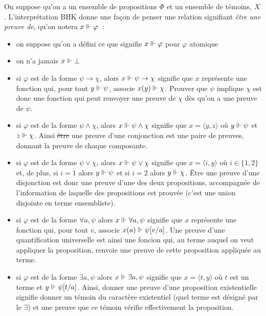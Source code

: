 \documentclass{article}
\begin{document}
On suppose qu'on a un ensemble de propositions $\Phi$ et un ensemble de témoins, $X$. L'interprétation BHK donne une façon de penser une relation signifiant \textit{être une preuve de}, qu'on notera $x\Vdash \varphi$~:
\begin{itemize}
\item on suppose qu'on a défini ce que signifie $x\Vdash\varphi$ pour $\varphi$ atomique
\item on n'a jamais $x\Vdash \bot$
\item si $\varphi$ est de la forme $\psi\to \chi$, alors $x\Vdash\psi \to\chi$ signifie que $x$ représente une fonction qui, pour tout $y\Vdash\psi$, associe $x(y)\Vdash\chi$. Prouver que $\psi$ implique $\chi$ est donc une fonction qui peut renvoyer une preuve de $\chi$ dès qu'on a une preuve de $\psi$.
\item si $\varphi$ est de la forme $\psi\land\chi$, alors $x\Vdash \psi\land \chi$ signifie que $x = \langle y,z\rangle$  où $y\Vdash \psi$ et $z\Vdash \chi$. Ainsi \sout{être} une preuve d'une conjonction est une paire de preuves, donnant la preuve de chaque composante.
\item si $\varphi$ est de la forme $\psi\lor\chi$, alors $x\Vdash\psi\lor \chi$ signifie que $x = \langle i,y\rangle$ où $i\in\{1,2\}$  et, de plus, si $i = 1$ alors $y\Vdash \psi$ et si $i = 2$ alors $y\Vdash \chi$. Être une preuve d'une disjonction est donc une preuve d'une des deux propositions, accompagnée de l'information de laquelle des propositions est prouvée (c'est une union disjointe en terme ensembliste).
\item si $\varphi$ est de la forme $\forall a, \psi$ alors $x\Vdash\forall a, \psi$ signifie que $x$ représente une fonction qui, pour tout $v$, associe $x(a)\Vdash \psi[v/a]$. Une preuve d'une quantification universelle est ainsi une foncion qui, au terme auquel on veut appliquer la proposition, renvoie une preuve de cette proposition appliquée au terme.
\item si $\varphi$ est de la forme $\exists a, \psi$ alors $x\Vdash \exists a, \psi$ signifie que $x = \langle t,y\rangle$ où $t$ est un terme et $y\Vdash \psi[t/a]$. Ainsi, donner une preuve d'une proposition existentielle signifie donner un témoin du caractère existentiel (quel terme est désigné par le $\exists$) et une preuve que ce témoin vérifie effectivement la proposition.
\end{itemize}
\end{document}
